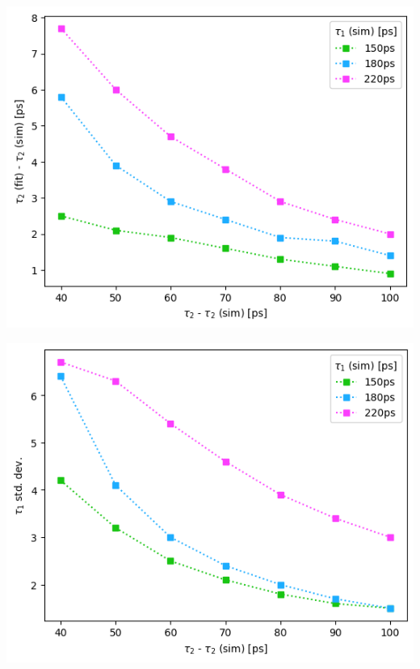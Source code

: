 {\begin{minipage}{.47\linewidth}
    \includegraphics[width=\linewidth]{Batch 3/regular IRF/t2-diff 5050.png}
    \label{fig:comp-t2-5050}
\end{minipage}
\hfill
\begin{minipage}{.47\linewidth}
    \includegraphics[width=\linewidth]{Batch 3/regular IRF/t2-err 5050.png}
    \label{fig:comp-t2err-5050}
\end{minipage}
\begin{minipage}{.47\linewidth}

\end{minipage}}
